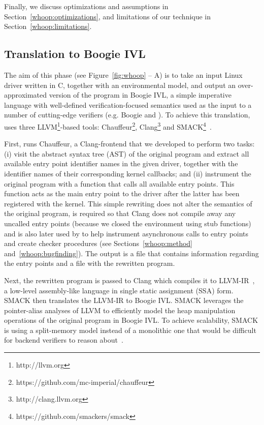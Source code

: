 Finally, we discuss optimizations and assumptions in Section~\ref{whoop:optimizations}, and limitations of our technique in Section~\ref{whoop:limitations}.

\subsection{Translation to Boogie IVL}
\label{whoop:translation}

The aim of this phase (see Figure~\ref{fig:whoop} -- A) is to take an input Linux driver written in C, together with an environmental model, and output an over-approximated version of the program in Boogie IVL, a simple imperative language with well-defined verification-focused semantics used as the input to a number of cutting-edge verifiers (e.g. Boogie and \corral). To achieve this translation, \whoop uses three LLVM\footnote{http://llvm.org}-based tools: Chauffeur\footnote{https://github.com/mc-imperial/chauffeur}, Clang\footnote{http://clang.llvm.org} and SMACK\footnote{https://github.com/smackers/smack}~\cite{rakamaric2014smack}.

First, \whoop runs Chauffeur, a Clang-frontend that we developed to perform two tasks: (i) visit the abstract syntax tree (AST) of the original program and extract all available entry point identifier names in the given driver, together with the identifier names of their corresponding kernel callbacks; and (ii) instrument the original program with a function that calls all available entry points. This function acts as the main entry point to the driver after the latter has been registered with the kernel. This simple rewriting does not alter the semantics of the original program, is required so that Clang does not compile away any uncalled entry points (because we closed the environment using stub functions) and is also later used by \whoop to help instrument asynchronous calls to entry points and create checker procedures (see Sections~\ref{whoop:method} and~\ref{whoop:bugfinding}). The output is a file that contains information regarding the entry points and a file with the rewritten program.

Next, the rewritten program is passed to Clang which compiles it to LLVM-IR~\cite{lattner2004llvm}, a low-level assembly-like language in single static assignment (SSA) form. SMACK then translates the LLVM-IR to Boogie IVL. SMACK leverages the pointer-alias analyses of LLVM to efficiently model the heap manipulation operations of the original program in Boogie IVL. To achieve scalability, SMACK is using a split-memory model instead of a monolithic one that would be difficult for backend verifiers to reason about~\cite{rakamaric2009scalable}.

